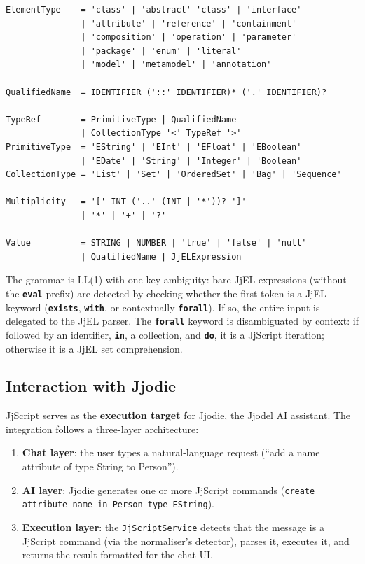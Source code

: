 \documentclass[11pt,a4paper]{article}
\newcommand{\jjscript}{\textsf{JjScript}}
\newcommand{\jjel}{\textsf{JjEL}}
\newcommand{\kw}[1]{\texttt{\textbf{#1}}}
\begin{document}
\begin{lstlisting}[style=grammar,caption={JjScript formal grammar in EBNF}]
ElementType    = 'class' | 'abstract' 'class' | 'interface'
               | 'attribute' | 'reference' | 'containment'
               | 'composition' | 'operation' | 'parameter'
               | 'package' | 'enum' | 'literal'
               | 'model' | 'metamodel' | 'annotation'

QualifiedName  = IDENTIFIER ('::' IDENTIFIER)* ('.' IDENTIFIER)?

TypeRef        = PrimitiveType | QualifiedName
               | CollectionType '<' TypeRef '>'
PrimitiveType  = 'EString' | 'EInt' | 'EFloat' | 'EBoolean'
               | 'EDate' | 'String' | 'Integer' | 'Boolean'
CollectionType = 'List' | 'Set' | 'OrderedSet' | 'Bag' | 'Sequence'

Multiplicity   = '[' INT ('..' (INT | '*'))? ']'
               | '*' | '+' | '?'

Value          = STRING | NUMBER | 'true' | 'false' | 'null'
               | QualifiedName | JjELExpression
\end{lstlisting}

The grammar is LL(1) with one key ambiguity: bare \jjel{} expressions
(without the \kw{eval} prefix) are detected by checking whether the
first token is a \jjel{} keyword (\kw{exists}, \kw{with}, or
contextually \kw{forall}). If so, the entire input is delegated to the
\jjel{} parser. The \kw{forall} keyword is disambiguated by context:
if followed by an identifier, \kw{in}, a collection, and \kw{do}, it is
a \jjscript{} iteration; otherwise it is a \jjel{} set comprehension.


\subsection{Interaction with Jjodie}\label{sec:jjscript-jjodie}

\jjscript{} serves as the \textbf{execution target} for Jjodie, the
Jjodel AI assistant. The integration follows a three-layer architecture:

\begin{enumerate}
    \item \textbf{Chat layer}: the user types a natural-language request
          (``add a name attribute of type String to Person'').
    \item \textbf{AI layer}: Jjodie generates one or more \jjscript{}
          commands (\texttt{create attribute name in Person type EString}).
    \item \textbf{Execution layer}: the \texttt{JjScriptService} detects
          that the message is a \jjscript{} command (via the normaliser's
          detector), parses it, executes it, and returns the result
          formatted for the chat UI.
\end{enumerate}
\end{document}
